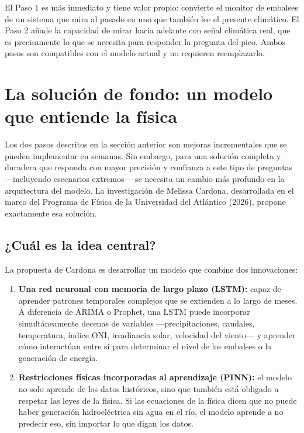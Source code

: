 \documentclass[11pt,a4paper]{article}
\begin{document}
\vspace{3mm}

El Paso 1 es más inmediato y tiene valor propio: convierte el monitor de embalses de un sistema que mira al pasado en uno que también lee el presente climático. El Paso 2 añade la capacidad de mirar hacia adelante con señal climática real, que es precisamente lo que se necesita para responder la pregunta del pico. Ambos pasos son compatibles con el modelo actual y no requieren reemplazarlo.

\section{La solución de fondo: un modelo que entiende la física}

Los dos pasos descritos en la sección anterior son mejoras incrementales que se pueden implementar en semanas. Sin embargo, para una solución completa y duradera que responda con mayor precisión y confianza a este tipo de preguntas —incluyendo escenarios extremos— se necesita un cambio más profundo en la arquitectura del modelo. La investigación de Melissa Cardona, desarrollada en el marco del Programa de Física de la Universidad del Atlántico (2026), propone exactamente esa solución.

\subsection{¿Cuál es la idea central?}

La propuesta de Cardona es desarrollar un modelo que combine dos innovaciones:

\begin{enumerate}[leftmargin=*,itemsep=4pt]
\item \textbf{Una red neuronal con memoria de largo plazo (LSTM):} capaz de aprender patrones temporales complejos que se extienden a lo largo de meses. A diferencia de ARIMA o Prophet, una LSTM puede incorporar simultáneamente decenas de variables —precipitaciones, caudales, temperatura, índice ONI, irradiancia solar, velocidad del viento— y aprender cómo interactúan entre sí para determinar el nivel de los embalses o la generación de energía.

\item \textbf{Restricciones físicas incorporadas al aprendizaje (PINN):} el modelo no solo aprende de los datos históricos, sino que también está obligado a respetar las leyes de la física. Si las ecuaciones de la física dicen que no puede haber generación hidroeléctrica sin agua en el río, el modelo aprende a no predecir eso, sin importar lo que digan los datos.
\end{enumerate}
\end{document}
